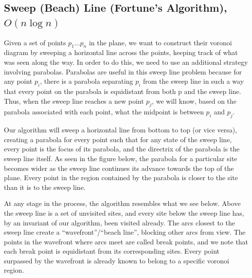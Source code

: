 \documentclass[12pt]{article}
\begin{document}
\subsection{Sweep (Beach) Line (Fortune's Algorithm), $O(n\log n)$}

    Given a set of points $p_1...p_n$ in the plane, we want to construct their 
    voronoi diagram by sweeping a horizontal line across the points, keeping track 
    of what was seen along the way.  In order to do this, we need to use an 
    additional strategy involving parabolas.  Parabolas are useful in this 
    sweep line problem because for any point $p_i$, there is a parabola separating 
    $p_i$ from the sweep line in such a way that every point on the parabola is 
    equidistant from both p and the sweep line.  Thus, when the sweep line reaches
    a new point $p_j$, we will know, based on the parabola associated with each point,
    what the midpoint is between $p_i$ and $p_j$.


    Our algorithm will sweep a horizontal line from bottom to top (or vice versa), creating
    a parabola for every point such that for any state of the sweep line, 
    every point is the focus of its parabola, and the directrix of the parabola 
    is the sweep line itself.  As seen in the figure below, the parabola for a 
    particular site becomes wider as the sweep line continues its advance 
    towards the top of the plane. Every point in the region contained by the parabola is closer to the site than it is to the sweep line. 


    \begin{center}
    \end{center}


    At any stage in the process, the algorithm resembles what we see below.
    Above the sweep line is a set of unvisited sites, and every site below
    the sweep line has, by an invariant of our algorithm, been visited already.  
    The arcs closest to the sweep line create a ``wavefront''/``beach line'', blocking other arcs
    from view.  The points in the wavefront where arcs meet are called
    break points, and we note that each break point is equidistant from its 
    corresponding sites.  Every point surpassed by the wavefront is already known
    to belong to a specific voronoi region.
\end{document}
